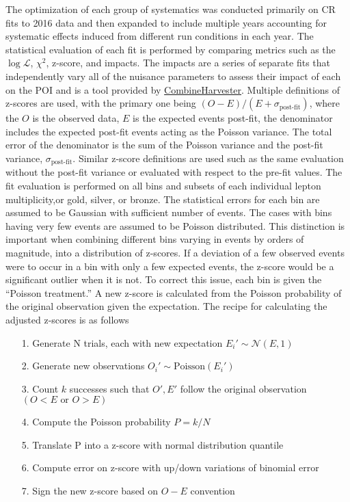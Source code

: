 The optimization of each group of systematics was conducted primarily on CR fits to 2016 data and then expanded to include multiple years accounting for systematic effects induced from different run conditions in each year. The statistical evaluation of each fit is performed by comparing metrics such as the $\log\mathcal{L}$, $\chi^2$, z-score, and impacts. The impacts are a series of separate fits that independently vary all of the nuisance parameters to assess their impact of each on the POI and is a tool provided by \url{CombineHarvester}. Multiple definitions of z-scores are used, with the primary one being $ (O-E)/(E+\sigma_{\text{post-fit}})$, where the $O$ is the observed data, $E$ is the expected events post-fit, the denominator includes the expected post-fit events acting as the Poisson variance. The total error of the denominator is the sum of the Poisson variance and the post-fit variance, $\sigma_{\text{post-fit}}$. Similar z-score definitions are used such as the same evaluation without the post-fit variance or evaluated with respect to the pre-fit values. The fit evaluation is performed on all bins and subsets of each individual lepton multiplicity,or gold, silver, or bronze. The statistical errors for each bin are assumed to be Gaussian with sufficient number of events. The cases with bins having very few events are assumed to be Poisson distributed. This distinction is important when combining different bins varying in events by orders of magnitude, into a distribution of z-scores. If a deviation of a few observed events were to occur in a bin with only a few expected events, the z-score would be a significant outlier when it is not. To correct this issue, each bin is given the ``Poisson treatment.'' A new z-score is calculated from the Poisson probability of the original observation given the expectation. The recipe for calculating the adjusted z-scores is as follows
\begin{itemize}
\item[1.] Generate N trials, each with new expectation $E_i' \sim \mathcal{N}(E,1)$
\item[2.] Generate new observations $O_i'\sim \text{Poisson}(E_i')$
\item[3.] Count $k$ successes such that $O',E'$ follow the original observation $(O<E \,\, \text{or} \, \, O>E)$
\item[4.] Compute the Poisson probability $P=k/N$ 
\item[5.] Translate P into a z-score with normal distribution quantile
\item[6.] Compute error on z-score with up/down variations of binomial error
\item[7.] Sign the new z-score based on $O-E$ convention
\end{itemize} 

